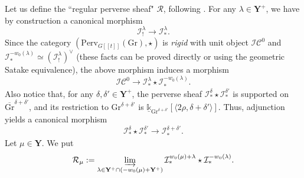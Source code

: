 \documentclass[11pt]{amsart}
\theoremstyle{plain}
\theoremstyle{remark}
\numberwithin{equation}{section}
\begin{document}
	
	Let us define the ``regular perverse sheaf" $\mathcal{R}$, following \cite[§5.2]{achar2022geometric}. For any $\lambda\in\mathbf{Y}^+$, we have by construction a canonical morphism
	$$\mathcal{I}^\lambda_!\to\mathcal{I}^\lambda_*. $$
	Since the category $(\mathrm{Perv}_{G[[t]]}(\mathrm{Gr}),\star)$ is \textit{rigid} with unit object $\mathcal{IC}^0$ and  $\mathcal{I}^{-w_0(\lambda)}_*\simeq (\mathcal{I}^\lambda_!)^\vee$ (these facts can be proved directly or using the geometric Satake equivalence), the above morphism induces a morphism
	\begin{equation}\label{can0}
		\mathcal{IC}^0\to  \mathcal{I}^\lambda_*\star\mathcal{I}^{-w_0(\lambda)}_*.
	\end{equation}
	Also notice that, for any $\delta,\delta'\in\mathbf{Y}^+$, the perverse sheaf $\mathcal{I}^\delta_*\star\mathcal{I}^{\delta'}_*$ is supported on $\overline{\mathrm{Gr}}^{\delta+\delta'}$, and its restriction to $\mathrm{Gr}^{\delta+\delta'}$ is $\underline{\mathbb{k}}_{\mathrm{Gr}^{\delta+\delta'}}[\langle2\rho,\delta+\delta'\rangle]$. Thus, adjunction yields a canonical morphism
	\begin{equation}\label{can1}
		\mathcal{I}^\delta_*\star\mathcal{I}^{\delta'}_*\to \mathcal{I}^{\delta+\delta'}_*.
	\end{equation}
	Let $\mu\in\mathbf{Y}$. We put 
	$$\mathcal{R}_\mu:=\varinjlim_{\lambda\in \mathbf{Y}^+\cap(-w_0(\mu)+\mathbf{Y}^+)}  \mathcal{I}^{w_0(\mu)+\lambda}_*\star\mathcal{I}^{-w_0(\lambda)}_*.$$
	
\end{document}
